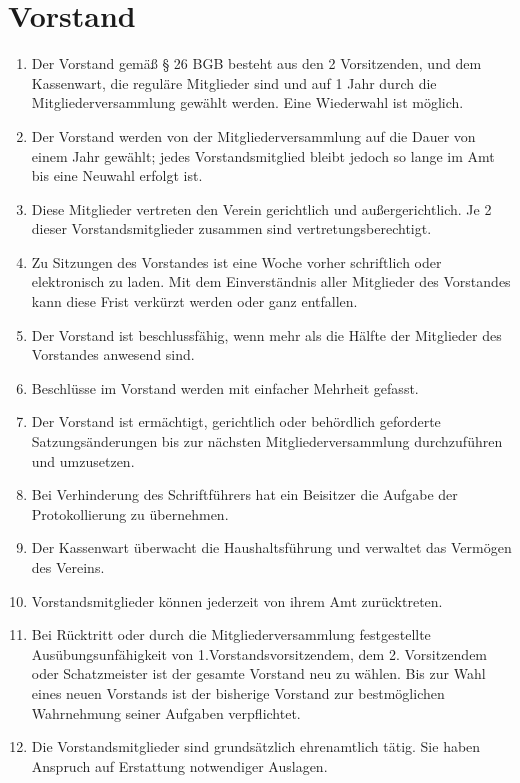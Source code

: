 \documentclass[ngerman]{article}
\begin{document}
\section{Vorstand}
\begin{enumerate}
  \item Der Vorstand gemäß § 26 BGB besteht aus den 2 Vorsitzenden, und dem Kassenwart, die reguläre Mitglieder sind und auf 1 Jahr durch die Mitgliederversammlung gewählt werden. Eine Wiederwahl ist möglich.
  \item Der Vorstand werden von der Mitgliederversammlung auf die Dauer von einem Jahr gewählt; jedes Vorstandsmitglied bleibt jedoch so lange im Amt bis eine Neuwahl erfolgt ist.
  \item Diese Mitglieder vertreten den Verein gerichtlich und außergerichtlich.
  Je 2 dieser Vorstandsmitglieder zusammen sind vertretungsberechtigt.
  \item Zu Sitzungen des Vorstandes ist eine Woche vorher schriftlich oder elektronisch zu laden.
  Mit dem Einverständnis aller Mitglieder des Vorstandes kann diese Frist verkürzt werden oder ganz entfallen.
  \item Der Vorstand ist beschlussfähig, wenn mehr als die Hälfte der Mitglieder des Vorstandes anwesend sind.
  \item Beschlüsse im Vorstand werden mit einfacher Mehrheit gefasst.
  \item Der Vorstand ist ermächtigt, gerichtlich oder behördlich geforderte Satzungsänderungen bis zur nächsten Mitgliederversammlung durchzuführen und umzusetzen.
  \item Bei Verhinderung des Schriftführers hat ein Beisitzer die Aufgabe der Protokollierung zu übernehmen.
  \item Der Kassenwart überwacht die Haushaltsführung und verwaltet das Vermögen des Vereins.
  \item Vorstandsmitglieder können jederzeit von ihrem Amt zurücktreten.
  \item Bei Rücktritt oder durch die Mitgliederversammlung festgestellte Ausübungsunfähigkeit von 1.Vorstandsvorsitzendem, dem 2. Vorsitzendem oder Schatzmeister ist der gesamte Vorstand neu zu wählen.
  Bis zur Wahl eines neuen Vorstands ist der bisherige Vorstand zur bestmöglichen Wahrnehmung seiner Aufgaben verpflichtet.
  \item Die Vorstandsmitglieder sind grundsätzlich ehrenamtlich tätig. Sie haben Anspruch auf Erstattung notwendiger Auslagen.
\end{enumerate}
\end{document}
